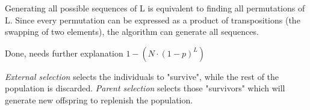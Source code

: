 \documentclass[10pt,a4paper,boxed]{hmcpset}
\begin{document}
\begin{problem}[Assignment 46]
\end{problem}
\begin{solution}
Generating all possible sequences of L is equivalent to finding all permutations of L. Since every permutation can be expressed as a product of transpositions (the swapping of two elements), the algorithm can generate all sequences.
\end{solution}

\begin{problem}[Assignment 47]
\end{problem}
\begin{solution}
Done, needs further explanation $1-(N \cdot (1-p)^L)$
\end{solution}

\begin{problem}[Assignment 48]
\end{problem}
\begin{solution}
\emph{External selection} selects the individuals to "survive", while the rest of the population is discarded. \emph{Parent selection} selects those "survivors" which will generate new offspring to replenish the population.
\end{solution}

\begin{problem}[Assignment 49]
\end{problem}
\begin{solution}
\end{solution}
\end{document}
